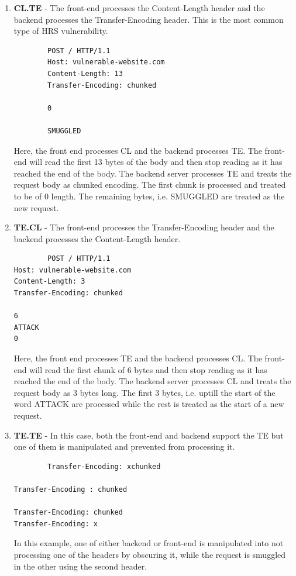 \documentclass[conference]{IEEEtran}
\begin{document}
\begin{enumerate}
	\item \textbf{CL.TE} - The front-end processes the Content-Length header and the backend processes the Transfer-Encoding header. This is the most common type of HRS vulnerability. \\
	\begin{verbatim}
		POST / HTTP/1.1
		Host: vulnerable-website.com
		Content-Length: 13
		Transfer-Encoding: chunked
		
		0

		SMUGGLED
	\end{verbatim}
Here, the front end processes CL and the backend processes TE. The front-end will read the first 13 bytes of the body and then stop reading as it has reached the end of the body. The backend server processes TE and treats the request body as chunked encoding. The first chunk is processed and treated to be of 0 length. The remaining bytes, i.e. SMUGGLED are treated as the new request.  \\
	


	\item \textbf{TE.CL} - The front-end processes the Transfer-Encoding header and the backend processes the Content-Length header. \\
	\begin{verbatim}
		POST / HTTP/1.1
Host: vulnerable-website.com
Content-Length: 3
Transfer-Encoding: chunked

6
ATTACK
0
	\end{verbatim}
Here, the front end processes TE and the backend processes CL. The front-end will read the first chunk of 6 bytes and then stop reading as it has reached the end of the body. The backend server processes CL and treats the request body as 3 bytes long. The first 3 bytes, i.e. uptill the start of the word ATTACK are processed while the rest is treated as the start of a new request.  \\
	\item \textbf{TE.TE} - In this case, both the front-end and backend support the TE but one of them is manipulated and prevented from processing it.
	\begin{verbatim}
		Transfer-Encoding: xchunked

Transfer-Encoding : chunked

Transfer-Encoding: chunked
Transfer-Encoding: x

	\end{verbatim}
	In this example, one of either backend or front-end is manipulated into not processing one of the headers by obscuring it, while the request is smuggled in the other using the second header. \\
\end{enumerate}
\end{document}
